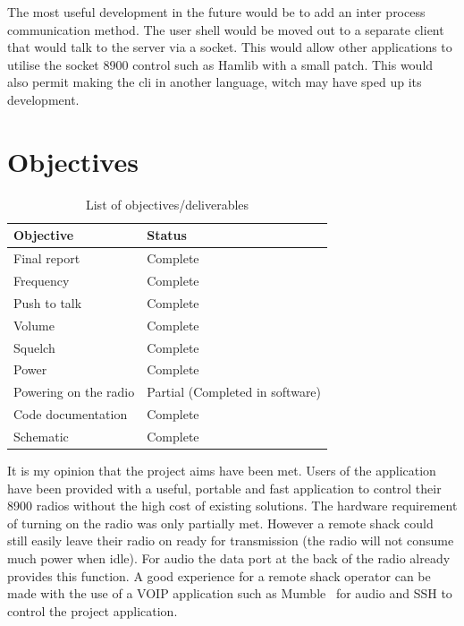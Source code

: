 The most useful development in the future would be to add an inter process communication method. The user shell would be moved out to a separate client that would talk to the server via a socket. This would allow other applications to utilise the socket \gls{8900} control such as Hamlib with a small patch. This would also permit making the \gls{cli} in another language, witch may have sped up its development.

\section{Objectives}

\begin{table}[H]
\centering
\begin{tabular}{l|l}
Objective & Status \\
\hline
Final report & Complete \\
Frequency & Complete \\
Push to talk & Complete \\
Volume & Complete \\
Squelch & Complete \\
Power & Complete \\
Powering on the radio & Partial (Completed in software) \\
Code documentation & Complete \\
Schematic & Complete
\end{tabular}
\caption{List of objectives/deliverables}
\label{table:objectives}
\end{table}

It is my opinion that the project aims have been met. Users of the application have been provided with a useful, portable and fast application to control their \gls{8900} radios without the high cost of existing solutions. The hardware requirement of turning on the radio was only partially met. However a remote shack could still easily leave their radio on ready for transmission (the radio will not consume much power when idle). For audio the data port at the back of the radio already provides this function. A good experience for a remote shack operator can be made with the use of a VOIP application such as Mumble~\cite{mumble} for audio and SSH to control the project application.